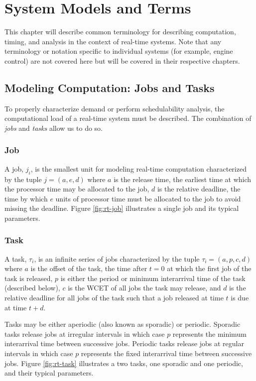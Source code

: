 \section{System Models and Terms}   \label{chap:systemModel}

This chapter will describe common terminology for describing computation, timing, and analysis in the context of real-time systems.
Note that any terminology or notation specific to individual systems (for example, engine control) are not covered here but will be covered in their respective chapters.

\subsection{Modeling Computation: Jobs and Tasks}

To properly characterize demand or perform schedulability analysis, the computational load of a real-time system must be described.
The combination of \textit{jobs} and \textit{tasks} allow us to do so.

\subsubsection{Job}

A job, $j_i$, is the smallest unit for modeling real-time computation characterized by the tuple $j = (a,e,d)$ where $a$ is the release time, the earliest time at which the processor time may be allocated to the job, $d$ is the relative deadline, the time by which $e$ units of processor time must be allocated to the job to avoid missing the deadline.
Figure \ref{fig:rt-job} illustrates a single job and its typical parameters.

\subsubsection{Task}

A task, $\tau_i$, is an infinite series of jobs characterized by the tuple $\tau_i = (a,p,c,d)$ where $a$ is the offset of the task, the time after $t=0$ at which the first job of the task is released, $p$ is either the period or minimum interarrival time of the task (described below), $c$ is the WCET of all jobs the task may release, and $d$ is the relative deadline for all jobs of the task such that a job released at time $t$ is due at time $t+d$.

Tasks may be either aperiodic (also known as sporadic) or periodic.
Sporadic tasks release jobs at irregular intervals in which case $p$ represents the minimum interarrival time between successive jobs.
Periodic tasks release jobs at regular intervals in which case $p$ represents the fixed interarrival time between successive jobs.
Figure \ref{fig:rt-task} illustrates a two tasks, one sporadic and one periodic, and their typical parameters.

